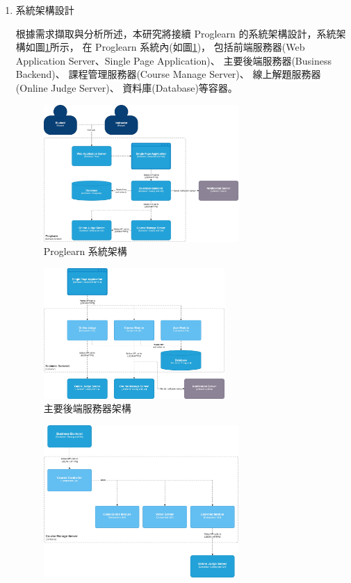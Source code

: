 \documentclass[12pt]{article}
\begin{document}
\begin{enumerate}
\begin{enumerate}
      \item 系統架構設計
        \par 根據需求擷取與分析所述，本研究將接續 Proglearn 的系統架構設計，系統架構如圖\ref{arc1}所示，
        在 Proglearn 系統內(如圖\ref{arc1})，
        包括前端服務器(Web Application Server、Single Page Application)、
        主要後端服務器(Business Backend)、
        課程管理服務器(Course Manage Server)、
        線上解題服務器(Online Judge Server)、
        資料庫(Database)等容器。
        \begin{figure}[htbp]
          \centering
          \includegraphics[width=0.7\textwidth]{./img/arc1.jpg}
          \caption{ Proglearn 系統架構}
          \label{arc1}
        \end{figure}
        \begin{figure}[htbp]
          \centering
          \includegraphics[width=0.65\textwidth]{./img/arc2.jpg}
          \caption{主要後端服務器架構}
          \label{arc2}
        \end{figure}
        \begin{figure}[htbp]
          \centering
          \includegraphics[width=0.7\textwidth]{./img/arc3.jpg}

\end{figure}
\end{enumerate}
\end{enumerate}
\end{document}
